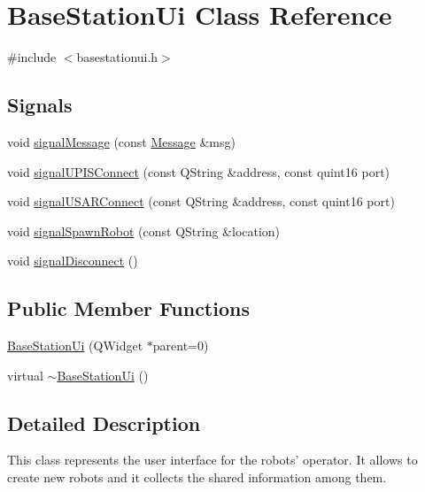 \hypertarget{classBaseStationUi}{
\section{BaseStationUi Class Reference}
\label{classBaseStationUi}
}


{\ttfamily \#include $<$basestationui.h$>$}

\subsection*{Signals}
\begin{DoxyCompactItemize}
\item 
void \hyperlink{classBaseStationUi_a58c791391c932937050b7e9ea73c064d}{signalMessage} (const \hyperlink{classMessage}{Message} \&msg)
\item 
void \hyperlink{classBaseStationUi_a591be9134fb7673ab8ba1c30e51eade2}{signalUPISConnect} (const QString \&address, const quint16 port)
\item 
void \hyperlink{classBaseStationUi_a1a62c9bc9bc446bba7b3bbaae36d47d4}{signalUSARConnect} (const QString \&address, const quint16 port)
\item 
void \hyperlink{classBaseStationUi_aa840d4d0187d14fce73a192dd2f81cef}{signalSpawnRobot} (const QString \&location)
\item 
void \hyperlink{classBaseStationUi_a60918c9ab8ff9714af4a45067349a4b7}{signalDisconnect} ()
\end{DoxyCompactItemize}
\subsection*{Public Member Functions}
\begin{DoxyCompactItemize}
\item 
\hyperlink{classBaseStationUi_a88774be8385c526e0f928a726470c2ca}{BaseStationUi} (QWidget $\ast$parent=0)
\item 
virtual \hyperlink{classBaseStationUi_ad9e4d5079883b96a1a12d0f9db529360}{$\sim$BaseStationUi} ()
\end{DoxyCompactItemize}


\subsection{Detailed Description}
This class represents the user interface for the robots' operator. It allows to create new robots and it collects the shared information among them. 

